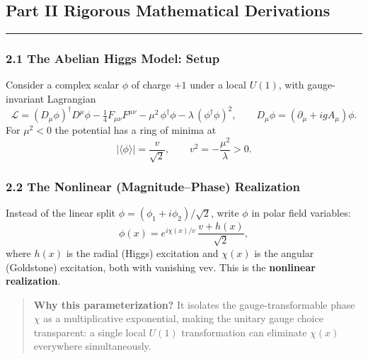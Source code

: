\documentclass[12pt,a4paper]{article}
\newcommand{\Lag}{\mathcal{L}}
\begin{document}
\subsection*{Part II \quad Rigorous Mathematical Derivations}
\hrule\medskip

\subsubsection*{2.1 \quad The Abelian Higgs Model: Setup}

Consider a complex scalar $\phi$ of charge $+1$ under a local $U(1)$, with gauge-invariant Lagrangian
\begin{equation}
  \Lag = (D_\mu\phi)^\dagger D^\mu\phi
       - \tfrac{1}{4}F_{\mu\nu}F^{\mu\nu}
       - \mu^2\,\phi^\dagger\phi
       - \lambda\,(\phi^\dagger\phi)^2 ,
  \qquad
  D_\mu\phi = (\partial_\mu + igA_\mu)\phi .
  \label{eq:sg:abelian_lag}
\end{equation}
For $\mu^2 < 0$ the potential has a ring of minima at
\begin{equation}
  |\langle\phi\rangle| = \frac{v}{\sqrt{2}},
  \qquad v^2 = -\frac{\mu^2}{\lambda} > 0 .
  \label{eq:sg:vev}
\end{equation}

\subsubsection*{2.2 \quad The Nonlinear (Magnitude--Phase) Realization}

Instead of the linear split $\phi = (\phi_1 + i\phi_2)/\sqrt{2}$, write $\phi$ in polar field variables:
\begin{equation}
  \phi(x) = e^{i\chi(x)/v}\,\frac{v + h(x)}{\sqrt{2}} ,
  \label{eq:sg:nonlinear}
\end{equation}
where $h(x)$ is the radial (Higgs) excitation and $\chi(x)$ is the angular (Goldstone) excitation, both with vanishing vev. This is the \textbf{nonlinear realization}.

\begin{quote}
\textbf{Why this parameterization?} It isolates the gauge-transformable phase $\chi$ as a multiplicative exponential, making the unitary gauge choice transparent: a single local $U(1)$ transformation can eliminate $\chi(x)$ everywhere simultaneously.
\end{quote}
\end{document}
